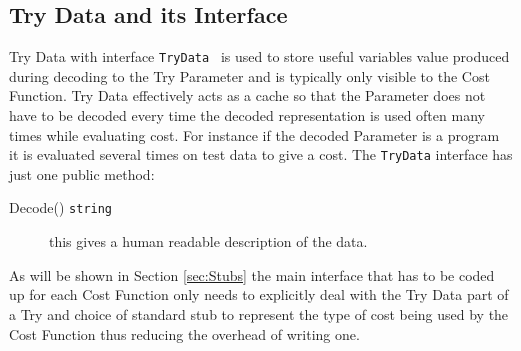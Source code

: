 \documentclass[a4paper,oneside,english]{book}
\numberwithin{equation}{section}
\numberwithin{figure}{section}
\begin{document}
\subsection{Try Data and its Interface}
Try Data  with interface \texttt{TryData } is used to store useful  variables value produced during decoding to  the Try Parameter and is typically only visible to the Cost Function. Try Data effectively acts as a cache so that the Parameter does not have to be decoded every time the decoded representation is used often many times while evaluating cost. For instance if the decoded Parameter is a program it is evaluated several times on test data to give a cost. The \texttt{TryData} interface has just one public method:
\begin{description}
	\item[Decode() \texttt{string}] this gives a human readable description of the data.
\end{description}
 
As will be shown in Section \ref{sec:Stubs} the main interface  that has to be coded up for each Cost Function only needs to explicitly deal with the Try Data part of a Try and choice of standard stub to represent the type of cost being used by the Cost Function thus reducing the overhead of writing one.
\end{document}
